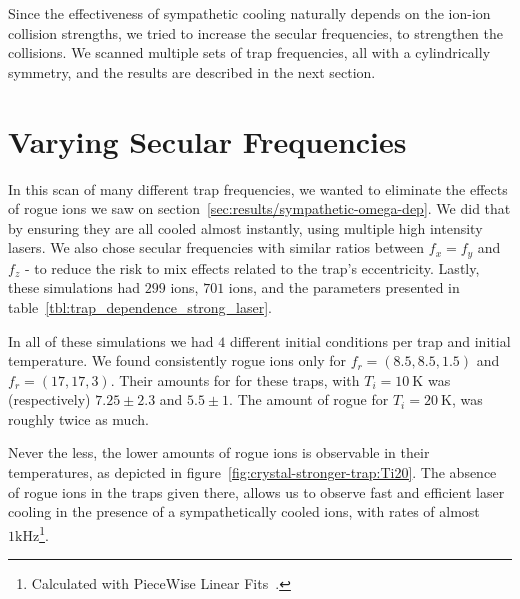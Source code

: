 Since the effectiveness of sympathetic cooling naturally depends on the ion-ion collision strengths, we tried to increase the secular frequencies, to strengthen the collisions. We scanned multiple sets of trap frequencies, all with a cylindrically symmetry, and the results are described in the next section.

\section{Varying Secular Frequencies}

In this scan of many different trap frequencies, we wanted to eliminate the effects of rogue  ions we saw on  section~\ref{sec:results/sympathetic-omega-dep}. We did that by ensuring they are all cooled almost instantly, using multiple high intensity lasers. We also chose secular frequencies with similar ratios between $f_x = f_y$ and $f_z$ - to reduce the risk to mix effects related to the trap's eccentricity. Lastly, these simulations had $299$  ions, $701$  ions, and the parameters presented in table~\ref{tbl:trap_dependence_strong_laser}.

\begin{table}
	\centering
	
	\caption{Parameters common for the multi-dimensional scan of trap secular frequencies and initial temperatures ($T_i$)}
	\label{tbl:trap_dependence_strong_laser}
\end{table}

In all of these simulations we had $4$ different initial conditions per trap and initial temperature. We found consistently rogue  ions only for $f_r = (8.5,8.5,1.5)$ and $f_r = (17,17,3)$. Their amounts for for these traps, with $T_i = 10\ \mathrm{K}$ was (respectively) $7.25\pm 2.3$ and $5.5\pm 1$. The amount of rogue  for $T_i = 20\ \mathrm{K}$, was roughly twice as much.

Never the less, the lower amounts of rogue  ions is observable in their temperatures, as depicted in figure~\ref{fig:crystal-stronger-trap:Ti20}. The absence of rogue  ions in the traps given there, allows us to observe fast and efficient laser cooling in the presence of a sympathetically cooled ions, with rates of almost $1 \mathrm{kHz}$\footnote{Calculated with PieceWise Linear Fits~\cite{pwlf}.}.

